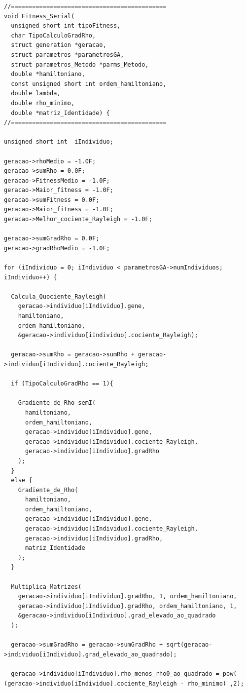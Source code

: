 			
	
\vspace{1 cm}
\begin{lstlisting}
//============================================
void Fitness_Serial(
  unsigned short int tipoFitness,
  char TipoCalculoGradRho,
  struct generation *geracao,
  struct parametros *parametrosGA,
  struct parametros_Metodo *parms_Metodo,
  double *hamiltoniano,
  const unsigned short int ordem_hamiltoniano,
  double lambda,
  double rho_minimo,
  double *matriz_Identidade) {
//============================================

unsigned short int	iIndividuo;

geracao->rhoMedio = -1.0F;
geracao->sumRho = 0.0F;
geracao->FitnessMedio = -1.0F;
geracao->Maior_fitness = -1.0F;
geracao->sumFitness = 0.0F;
geracao->Maior_fitness = -1.0F;
geracao->Melhor_cociente_Rayleigh = -1.0F;

geracao->sumGradRho = 0.0F;
geracao->gradRhoMedio = -1.0F;

for (iIndividuo = 0; iIndividuo < parametrosGA->numIndividuos; iIndividuo++) {

  Calcula_Quociente_Rayleigh(
    geracao->individuo[iIndividuo].gene,
    hamiltoniano,
    ordem_hamiltoniano,
    &geracao->individuo[iIndividuo].cociente_Rayleigh);

  geracao->sumRho = geracao->sumRho + geracao->individuo[iIndividuo].cociente_Rayleigh;

  if (TipoCalculoGradRho == 1){
	
    Gradiente_de_Rho_semI(
      hamiltoniano,
      ordem_hamiltoniano,
      geracao->individuo[iIndividuo].gene,
      geracao->individuo[iIndividuo].cociente_Rayleigh,
      geracao->individuo[iIndividuo].gradRho
    );		
  }
  else {
    Gradiente_de_Rho(
      hamiltoniano,
      ordem_hamiltoniano,
      geracao->individuo[iIndividuo].gene,
      geracao->individuo[iIndividuo].cociente_Rayleigh,
      geracao->individuo[iIndividuo].gradRho,
      matriz_Identidade
    );
  }

  Multiplica_Matrizes(
    geracao->individuo[iIndividuo].gradRho, 1, ordem_hamiltoniano,
    geracao->individuo[iIndividuo].gradRho, ordem_hamiltoniano, 1,
    &geracao->individuo[iIndividuo].grad_elevado_ao_quadrado
  );

  geracao->sumGradRho = geracao->sumGradRho + sqrt(geracao->individuo[iIndividuo].grad_elevado_ao_quadrado);

  geracao->individuo[iIndividuo].rho_menos_rho0_ao_quadrado = pow( (geracao->individuo[iIndividuo].cociente_Rayleigh - rho_minimo) ,2);


\end{lstlisting}
